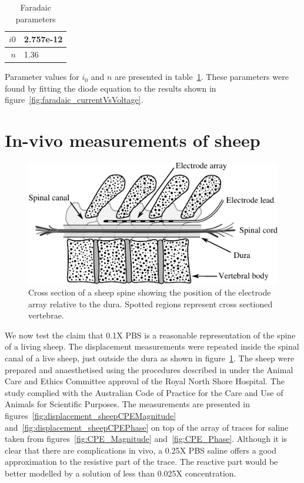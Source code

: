 \documentclass[journal, a4paper]{IEEEtran}
\begin{document}
\begin{table}
    \begin{center}
        \begin{tabular}{|r|l|}
            \hline
            $i0$ & 2.757e-12\\ \hline
            $n$ & 1.36\\ \hline
        \end{tabular}
    \end{center}
    \caption{Faradaic parameters}
    \label{tab:FaradaicParams}
\end{table}

Parameter values for $i_{0}$ and $n$ are presented in table~\ref{tab:FaradaicParams}. These parameters were found by fitting the diode equation to the results shown in figure~\ref{fig:faradaic_currentVsVoltage}.

\section{In-vivo measurements of sheep}

\begin{figure}
    \begin{center}
        \includegraphics{graphics/sheepSpine}
    \end{center}
    \caption{Cross section of a sheep spine showing the position of the electrode array relative to the dura. Spotted regions represent cross sectioned vertebrae.}
    \label{fig:sheepSpine}
\end{figure}

We now test the claim that 0.1X PBS is a reasonable representation of the spine of a living sheep.
The displacement measurements were repeated inside the spinal canal of a live sheep, just outside the dura as shown in figure~\ref{fig:sheepSpine}. The sheep were prepared and anaesthetised using the procedures described in \cite{Parker2013} under the Animal Care and Ethics Committee approval of the Royal North Shore Hospital. The study complied with the Australian Code of Practice for the Care and Use of Animals for Scientific Purposes. The measurements are presented in figures~\ref{fig:displacement_sheepCPEMagnitude} and~\ref{fig:displacement_sheepCPEPhase} on top of the array of traces for saline taken from figures~\ref{fig:CPE_Magnitude}
and~\ref{fig:CPE_Phase}.
Although it is clear that there are complications in vivo, a 0.25X PBS saline offers a good approximation to the resistive part of the trace.
The reactive part would be better modelled by a solution of less than 0.025X concentration.
\end{document}
